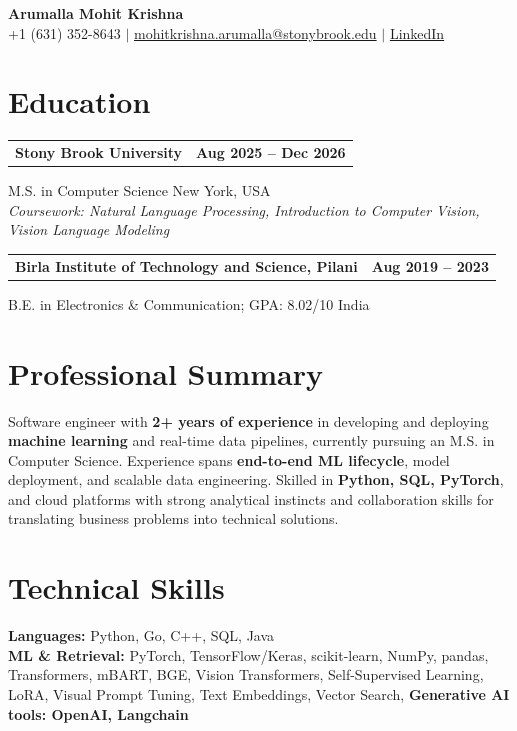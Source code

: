 \documentclass[letterpaper,10pt]{article}
\makeatletter
\newcommand{\entry}[2]{%
  \noindent
  \begin{tabularx}{\linewidth}
    {@{}>{\raggedright\arraybackslash}X@{\hspace{6pt}}r@{}}
    \textbf{#1} & #2
  \end{tabularx}\par
}
\makeatother
\begin{document}
\begin{center}
    {\LARGE\bfseries Arumalla Mohit Krishna}\\[3pt]
    +1 (631) 352-8643 $|$
    \href{mailto:mohitkrishna.arumalla@stonybrook.edu}
    {mohitkrishna.arumalla@stonybrook.edu} $|$
    \href{https://linkedin.com/in/mohit-krishna-arumalla}
    {LinkedIn}
\end{center}
\vspace{-8pt}

\section{Education}

\entry
  {\textbf{Stony Brook University}}
  {\textbf{Aug 2025 -- Dec 2026}}

M.S. in Computer Science \hfill New York, USA\\
\textit{
Coursework: Natural Language Processing,
Introduction to Computer Vision, Vision Language Modeling
}
\vspace{3pt}

\entry
  {\textbf{Birla Institute of Technology and Science, Pilani}}
  {\textbf{Aug 2019 -- 2023}}

B.E. in Electronics \& Communication; GPA: 8.02/10 \hfill India
\section{Professional Summary}

Software engineer with \textbf{2+ years of experience} in developing and deploying \textbf{machine learning} and real-time data pipelines, currently pursuing an M.S. in Computer Science. Experience spans \textbf{end-to-end ML lifecycle}, model deployment, and scalable data engineering. Skilled in \textbf{Python, SQL, PyTorch}, and cloud platforms with strong analytical instincts and collaboration skills for translating business problems into technical solutions.

\section{Technical Skills}

\textbf{Languages:}
Python, Go, C++, SQL, Java\\

\textbf{ML \& Retrieval:}
PyTorch, TensorFlow/Keras, scikit-learn, NumPy, pandas,
Transformers, mBART, BGE, Vision Transformers,
Self-Supervised Learning, LoRA, Visual Prompt Tuning,
Text Embeddings, Vector Search, \textbf{Generative AI tools: OpenAI, Langchain}\\
\end{document}
